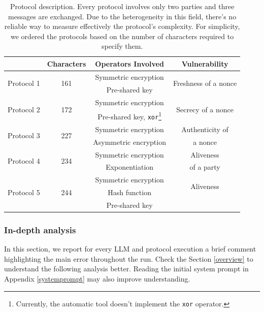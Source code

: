 \begin{table}[htbp]
\centering
\begin{tabular}{|c|c|c|c|}
\hline
& \textbf{Characters} & \textbf{Operators Involved} & \textbf{Vulnerability} \\ 
\hline
\multirow{2}{*}{Protocol 1} & \multirow{2}{*}{161} & Symmetric encryption & \multirow{2}{*}{Freshness of a nonce} \\
                            &                    & Pre-shared key        &   \\
\hline
\multirow{2}{*}{Protocol 2} & \multirow{2}{*}{172} & Symmetric encryption  & \multirow{2}{*}{Secrecy of a nonce} \\
                            &                    & Pre-shared key, \texttt{xor}\footnote{Currently, the automatic tool doesn't implement the \texttt{xor} operator.} &   \\
\hline
\multirow{2}{*}{Protocol 3} & \multirow{2}{*}{227} & Symmetric encryption & Authenticity of  \\
                            &                    & Asymmetric encryption        &   a nonce \\
\hline
\multirow{2}{*}{Protocol 4} & \multirow{2}{*}{234} & Symmetric encryption & Aliveness\\
                            &                    & Exponentiation       & of a party\\
\hline
\multirow{3}{*}{Protocol 5} & \multirow{3}{*}{244} & Symmetric encryption & \multirow{2}{*}{Aliveness}\\
                            &                    & Hash function     & \multirow{2}{*}{of a party}\\
                            &                    & Pre-shared key        &   \\ 
\hline
\end{tabular}
\caption{Protocol description. Every protocol involves only two parties and three messages are exchanged. Due to the heterogeneity in this field, there's no reliable way to measure effectively the protocol's complexity. For simplicity, we ordered the protocols based on the number of characters required to specify them.}
\end{table}

\subsubsection{In-depth analysis}
In this section, we report for every LLM and protocol execution a brief comment highlighting the main error throughout the run. Check the Section \ref{overview} to understand the following analysis better. Reading the initial system prompt in Appendix \ref{systemprompt} may also improve understanding.

